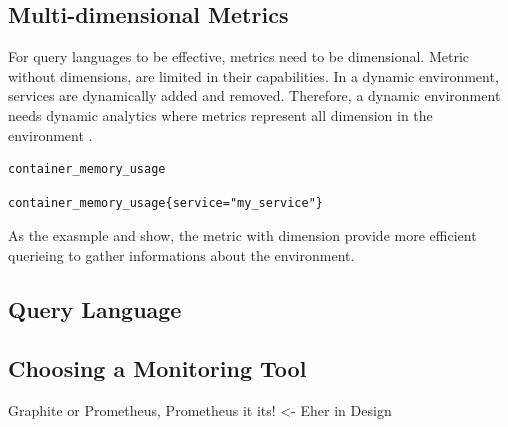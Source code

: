 \subsection{Multi-dimensional Metrics}
For query languages to be effective, metrics need to be dimensional. Metric without dimensions, are limited in their capabilities.
In a dynamic environment, services are dynamically added and removed. Therefore, a dynamic environment needs dynamic analytics where metrics represent all dimension in the environment \cite{Farcic2018Toolkit22}.
\begin{lstlisting}[frame=single, label=lst:mon_metr_dimless, caption=Example of a dimensionless-metric, captionpos=b]
container_memory_usage
\end{lstlisting}
\begin{lstlisting}[frame=single, label=lst:mon_metr_withdim, caption=Example of a metric with dimensions, captionpos=b]
container_memory_usage{service="my_service"}
\end{lstlisting}
As the exasmple  and  show, the metric with dimension provide more efficient querieing to gather informations about the environment.


\subsection{Query Language}



\subsection{Choosing a Monitoring Tool}
Graphite or Prometheus, Prometheus it its! <- Eher in Design

